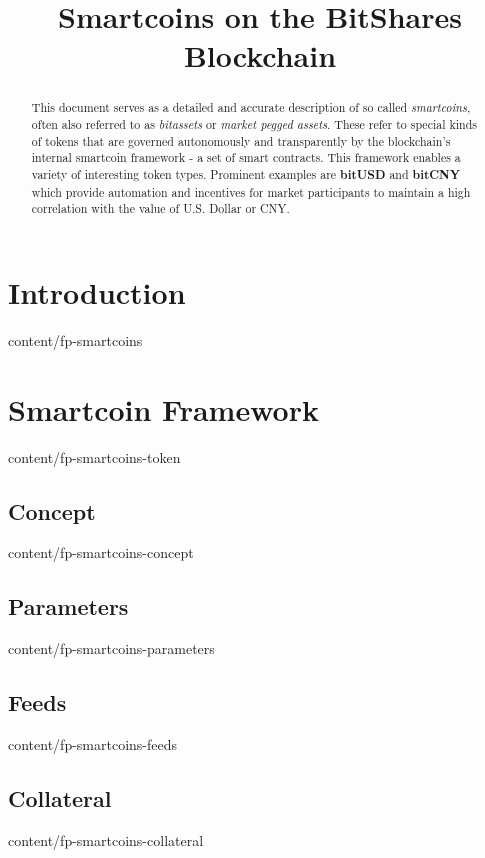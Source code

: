 \documentclass{btswhitepaper}
\title{Smartcoins on the BitShares Blockchain}
\begin{document}
\sloppy
\maketitle

\begin{abstract}%

 This document serves as a detailed and accurate description of so called
 \emph{smartcoins}, often also referred to as \emph{bitassets} or \emph{market
 pegged assets}. These refer to special kinds of tokens that are governed
 autonomously and transparently by the blockchain's internal smartcoin
 framework - a set of smart contracts. This framework enables a variety of
 interesting token types. Prominent examples are \textbf{bitUSD} and
 \textbf{bitCNY} which provide automation and incentives for market
 participants to maintain a high correlation with the value of U.S. Dollar or
 CNY.

\end{abstract}

\section       { Introduction                                     }  { content/fp-smartcoins             }

\section       { Smartcoin Framework                              }  { content/fp-smartcoins-token       }
\subsection    { Concept                                          }  { content/fp-smartcoins-concept     }
\subsection    { Parameters                                       }  { content/fp-smartcoins-parameters  }
\subsection    { Feeds                                            }  { content/fp-smartcoins-feeds       }
\subsection    { Collateral                                       }  { content/fp-smartcoins-collateral  }
\end{document}
